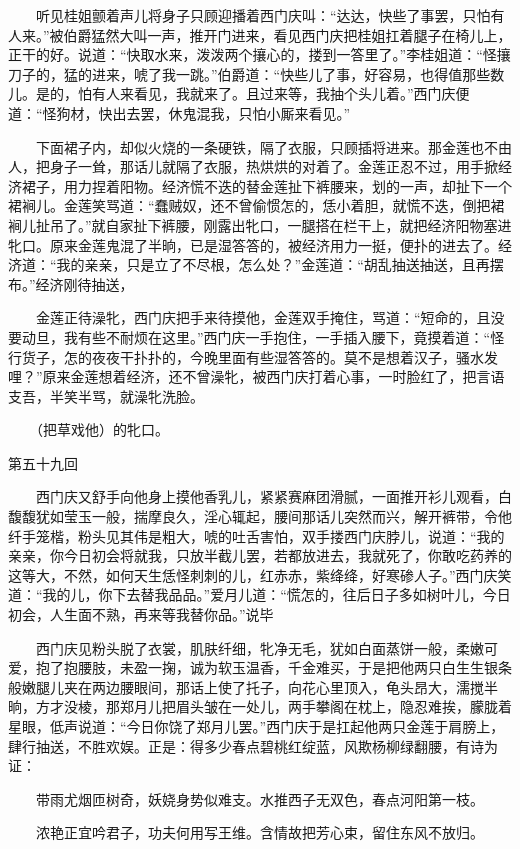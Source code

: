　　听见桂姐颤着声儿将身子只顾迎播着西门庆叫：“达达，快些了事罢，只怕有人来。”被伯爵猛然大叫一声，推开门进来，看见西门庆把桂姐扛着腿子在椅儿上，正干的好。说道：“快取水来，泼泼两个攘心的，搂到一答里了。”李桂姐道：“怪攘刀子的，猛的进来，唬了我一跳。”伯爵道：“快些儿了事，好容易，也得值那些数儿。是的，怕有人来看见，我就来了。且过来等，我抽个头儿着。”西门庆便道：“怪狗材，快出去罢，休鬼混我，只怕小厮来看见。”


　　下面裙子内，却似火烧的一条硬铁，隔了衣服，只顾插将进来。那金莲也不由人，把身子一耸，那话儿就隔了衣服，热烘烘的对着了。金莲正忍不过，用手掀经济裙子，用力捏着阳物。经济慌不迭的替金莲扯下裤腰来，划的一声，却扯下一个裙裥儿。金莲笑骂道：“蠢贼奴，还不曾偷惯怎的，恁小着胆，就慌不迭，倒把裙裥儿扯吊了。”就自家扯下裤腰，刚露出牝口，一腿搭在栏干上，就把经济阳物塞进牝口。原来金莲鬼混了半晌，已是湿答答的，被经济用力一挺，便扑的进去了。经济道：“我的亲亲，只是立了不尽根，怎么处？”金莲道：“胡乱抽送抽送，且再摆布。”经济刚待抽送，


　　金莲正待澡牝，西门庆把手来待摸他，金莲双手掩住，骂道：“短命的，且没要动旦，我有些不耐烦在这里。”西门庆一手抱住，一手插入腰下，竟摸着道：“怪行货子，怎的夜夜干扑扑的，今晚里面有些湿答答的。莫不是想着汉子，骚水发哩？”原来金莲想着经济，还不曾澡牝，被西门庆打着心事，一时脸红了，把言语支吾，半笑半骂，就澡牝洗脸。


　　（把草戏他）的牝口。

第五十九回

　　西门庆又舒手向他身上摸他香乳儿，紧紧赛麻团滑腻，一面推开衫儿观看，白馥馥犹如莹玉一般，揣摩良久，淫心辄起，腰间那话儿突然而兴，解开裤带，令他纤手笼楷，粉头见其伟是粗大，唬的吐舌害怕，双手搂西门庆脖儿，说道：“我的亲亲，你今日初会将就我，只放半截儿罢，若都放进去，我就死了，你敢吃药养的这等大，不然，如何天生恁怪刺刺的儿，红赤赤，紫绛绛，好寒碜人子。”西门庆笑道：“我的儿，你下去替我品品。”爱月儿道：“慌怎的，往后日子多如树叶儿，今日初会，人生面不熟，再来等我替你品。”说毕


　　西门庆见粉头脱了衣裳，肌肤纤细，牝净无毛，犹如白面蒸饼一般，柔嫩可爱，抱了抱腰肢，未盈一掬，诚为软玉温香，千金难买，于是把他两只白生生银条般嫩腿儿夹在两边腰眼间，那话上使了托子，向花心里顶入，龟头昂大，濡搅半晌，方才没棱，那郑月儿把眉头皱在一处儿，两手攀阁在枕上，隐忍难挨，朦胧着星眼，低声说道：“今日你饶了郑月儿罢。”西门庆于是扛起他两只金莲于肩膀上，肆行抽送，不胜欢娱。正是：得多少春点碧桃红绽蓝，风欺杨柳绿翻腰，有诗为证：

　　带雨尤烟匝树奇，妖娆身势似难支。水推西子无双色，春点河阳第一枝。

　　浓艳正宜吟君子，功夫何用写王维。含情故把芳心束，留住东风不放归。


